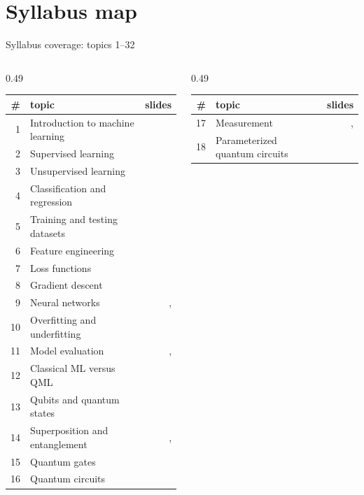 \documentclass[aspectratio=169,11pt]{beamer}
\begin{document}
\section{Syllabus map}
\begin{frame}{Syllabus coverage: topics 1--32}
  \tiny
  \begin{columns}[T]
    \begin{column}{0.49\textwidth}
\begin{tabular}{rlr}\toprule \# & topic & slides\\ \midrule
1 & Introduction to machine learning & \pageref{fML} \\
2 & Supervised learning & \pageref{fKinds} \\
3 & Unsupervised learning & \pageref{fKinds} \\
4 & Classification and regression & \pageref{fKinds} \\
5 & Training and testing datasets & \pageref{fSplit} \\
6 & Feature engineering & \pageref{fFeat} \\
7 & Loss functions & \pageref{fLoss} \\
8 & Gradient descent & \pageref{fGD} \\
9 & Neural networks & \pageref{fNN}, \pageref{fBackprop} \\
10 & Overfitting and underfitting & \pageref{fFit} \\
11 & Model evaluation & \pageref{fEval}, \pageref{fUnc} \\
12 & Classical ML versus QML & \pageref{fCvQ} \\
13 & Qubits and quantum states & \pageref{fQubit} \\
14 & Superposition and entanglement & \pageref{fQubit}, \pageref{fEnt} \\
15 & Quantum gates & \pageref{fGates} \\
16 & Quantum circuits & \pageref{fCirc} \\
\bottomrule\end{tabular}
    \end{column}
    \begin{column}{0.49\textwidth}
\begin{tabular}{rlr}\toprule \# & topic & slides\\ \midrule
17 & Measurement & \pageref{fQubit}, \pageref{fCirc} \\
18 & Parameterized quantum circuits & \pageref{fPQC} \\

\end{tabular}
\end{column}
\end{columns}
\end{frame}
\end{document}
